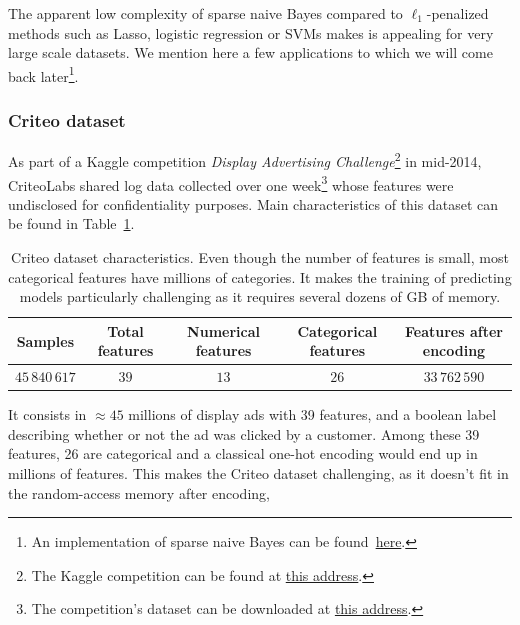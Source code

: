 The apparent low complexity of sparse naive Bayes compared to $\ell_1$-penalized methods such as
Lasso, logistic regression or SVMs makes is appealing for very large scale datasets.
We mention here a few applications to which we will come back later\footnote{
    An implementation of sparse naive Bayes can be found~\href{https://github.com/aspremon/NaiveFeatureSelection}{here}.
}.

\subsubsection{Criteo dataset}\label{subsubsec:snb_criteo}

As part of a Kaggle competition \emph{Display Advertising Challenge}\footnote{
    The Kaggle competition can be found at
    \href{https://www.kaggle.com/c/criteo-display-ad-challenge}{this address}.
}
in mid-2014, CriteoLabs shared log data collected over one week\footnote{
    The competition's dataset can be downloaded at
    \href{https://labs.criteo.com/2014/02/download-kaggle-display-advertising-challenge-dataset/}{this address}.
}
whose features were undisclosed for confidentiality purposes.
Main characteristics of this dataset can be found in Table~\ref{tab:criteo_dataset}.
\begin{table}[!htb]
    \centering
    \setlength{\tabcolsep}{2pt}
    {\small
        \begin{tabular}{|c|c|c|c|c|}\hline
        \textbf{Samples} & \textbf{Total features} & \textbf{Numerical features} & \textbf{Categorical features} & \textbf{Features after encoding}\\ \hline
        $45\,840\,617$ & $39$  & $13$ & $26$ & $33\,762\,590$ \\ \hline
        \end{tabular}
    }%
    \caption[short]{
        Criteo dataset characteristics.
        Even though the number of features is small,
        most categorical features have millions of categories.
        It makes the training of predicting models particularly challenging as it requires several
        dozens of GB of memory.
    }
    \label{tab:criteo_dataset}
\end{table}
It consists in $\approx 45$ millions of display ads with 39 features,
and a boolean label describing whether or not the ad was clicked by a customer.
Among these 39 features, 26 are categorical and a classical one-hot encoding would end up in millions of features.
This makes the Criteo dataset challenging, as it doesn't fit in the random-access memory after encoding,
